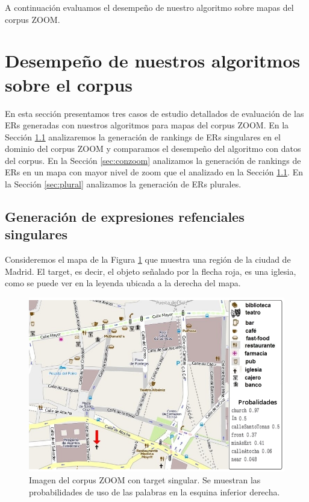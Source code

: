 A continuaci\'on evaluamos el desempe\~no de nuestro algoritmo sobre mapas del corpus ZOOM.

\section{Desempe\~no de nuestros algoritmos sobre el corpus}
\label{sec:caso_estudio}

En esta secci\'on presentamos tres casos de estudio detallados de evaluaci\'on de las ERs generadas con nuestros algoritmos para mapas del corpus ZOOM. En la Secci\'on \ref{sec:sinzoom} analizaremos la generaci\'on de rankings de ERs singulares en el dominio del corpus ZOOM y comparamos el desempe\~no del algoritmo con datos del corpus. En la Secci\'on \ref{sec:conzoom} analizamos la generaci\'on de rankings de ERs en un mapa con mayor nivel de zoom que el analizado en la Secci\'on \ref{sec:sinzoom}. En la Secci\'on \ref{sec:plural} analizamos la generaci\'on de ERs plurales.

\subsection{Generaci\'on de expresiones refenciales singulares}
\label{sec:sinzoom}

Consideremos el mapa de la Figura \ref{mapa-zoom1} que muestra una regi\'on de la ciudad de Madrid. El target, es decir, el objeto se\~nalado por la flecha roja, es una iglesia, como se puede ver en la leyenda ubicada a la derecha del mapa. 

\begin{figure}[h]
\begin{center}
\includegraphics[width=\textwidth]{images/corpus/mapa6-prob.png}
\caption{Imagen del corpus ZOOM con target singular. Se muestran las probabilidades de uso de las palabras en la esquina inferior derecha.}
\label{mapa-zoom1}
\end{center}
\end{figure}

